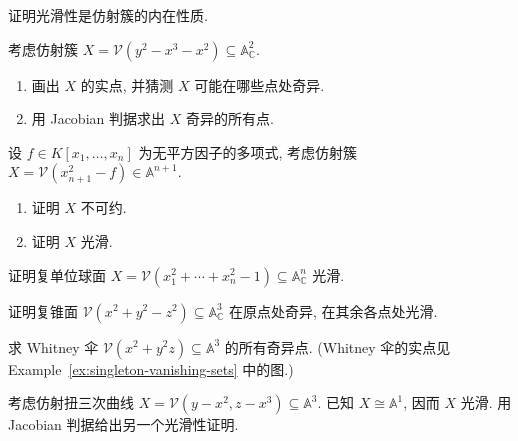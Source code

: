 \BookExerciseHeading
\begin{BookExercises}
  \item\label{ex:smoothness-is-intrinsic} 证明光滑性是仿射簇的内在性质.
  \item\label{ex:singularities-of-nodal-cubic} 考虑仿射簇 $X=\mathcal{V}(y^{2}-x^{3}-x^{2})\subseteq\mathbb{A}^{2}_{\mathbb{C}}$.
  \begin{enumerate}
    \item 画出 $X$ 的实点, 并猜测 $X$ 可能在哪些点处奇异.
    \item 用 Jacobian 判据求出 $X$ 奇异的所有点.
  \end{enumerate}
  \item\label{ex:smooth-affine-double-cover-of-square-free-polynomial} 设 $f\in K[x_{1},\ldots,x_{n}]$ 为无平方因子的多项式, 考虑仿射簇 $X=\mathcal{V}(x_{n+1}^{2}-f)\in\mathbb{A}^{n+1}$.
  \begin{enumerate}
    \item 证明 $X$ 不可约.
    \item 证明 $X$ 光滑.
  \end{enumerate}
  \item\label{ex:complex-unit-sphere-is-smooth} 证明复单位球面 $X=\mathcal{V}(x_{1}^{2}+\cdots+x_{n}^{2}-1)\subseteq\mathbb{A}_{\mathbb{C}}^{n}$ 光滑.
  \item\label{ex:complex-cone-smooth-except-at-origin} 证明复锥面 $\mathcal{V}(x^{2}+y^{2}-z^{2})\subseteq\mathbb{A}^{3}_{\mathbb{C}}$ 在原点处奇异, 在其余各点处光滑.
  \item\label{ex:singular-points-of-whitney-umbrella} 求 Whitney 伞 $\mathcal{V}(x^{2}+y^{2}z)\subseteq\mathbb{A}^{3}$ 的所有奇异点. (Whitney 伞的实点见 Example~\ref{ex:singleton-vanishing-sets} 中的图.)
  \item\label{ex:jacobian-smoothness-of-affine-twisted-cubic} 考虑仿射扭三次曲线 $X=\mathcal{V}(y-x^{2},z-x^{3})\subseteq\mathbb{A}^{3}$. 已知 $X\cong\mathbb{A}^{1}$, 因而 $X$ 光滑. 用 Jacobian 判据给出另一个光滑性证明.
\end{BookExercises}
